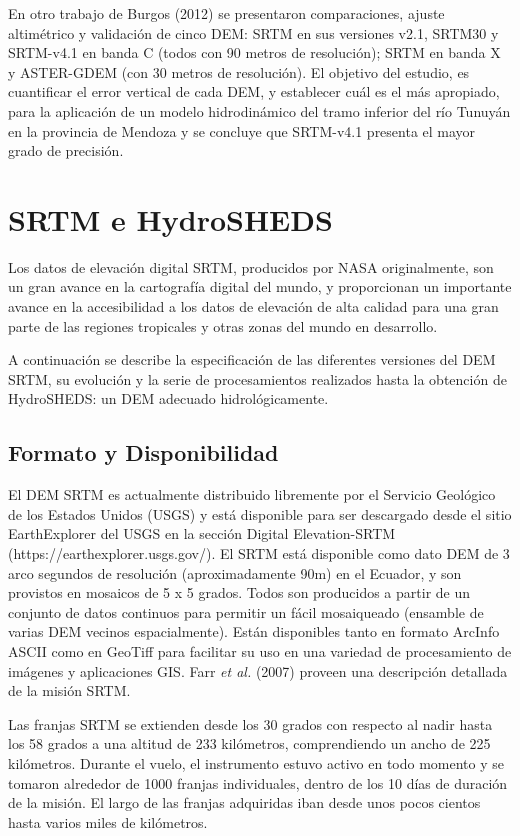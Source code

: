 \documentclass[10pt,a4paper, twoside]{report}
\begin{document}
En otro trabajo de Burgos (2012) se presentaron comparaciones, ajuste altimétrico y validación de cinco DEM: SRTM en sus versiones v2.1, SRTM30 y SRTM-v4.1 en banda C (todos con 90 metros de resolución); SRTM en banda X y ASTER-GDEM (con 30 metros de resolución). El objetivo del estudio, es cuantificar el error vertical de cada DEM, y
establecer cuál es el más apropiado, para la aplicación de un modelo hidrodinámico del tramo inferior del río Tunuyán en la provincia de Mendoza y se concluye que SRTM-v4.1 presenta el mayor grado de precisión. 

\section{SRTM e HydroSHEDS}
\label{SRTMeHydroSHEDS}

Los datos de elevación digital SRTM, producidos por NASA originalmente, son un gran avance en la cartografía digital del mundo, y proporcionan un importante avance en la accesibilidad a los datos de elevación de alta calidad para una gran parte de las regiones tropicales y otras zonas del mundo en desarrollo.

A continuación se describe la especificación de las diferentes versiones del DEM SRTM, su evolución y la serie de procesamientos realizados hasta la obtención de HydroSHEDS: un DEM adecuado hidrológicamente.



\subsection{Formato y Disponibilidad}

El DEM SRTM es actualmente distribuido libremente por el Servicio Geológico de los Estados Unidos (USGS) y está disponible para ser descargado desde el sitio EarthExplorer del USGS en la sección Digital Elevation-SRTM (https://earthexplorer.usgs.gov/). El SRTM está disponible como dato DEM de 3 arco segundos de resolución (aproximadamente 90m) en el Ecuador, y son provistos en mosaicos de 5 x 5 grados. Todos son producidos a partir de un conjunto de datos continuos para permitir un fácil mosaiqueado (ensamble de varias DEM vecinos espacialmente). Están disponibles tanto en formato ArcInfo ASCII como en GeoTiff para facilitar su uso en una variedad de procesamiento de imágenes y aplicaciones GIS. Farr \textit{et al.} (2007) proveen una descripción detallada de la misión SRTM.

Las franjas SRTM se extienden desde los 30 grados con respecto al nadir hasta los 58 grados a una altitud de 233 kilómetros, comprendiendo un ancho de 225 kilómetros. Durante el vuelo, el instrumento estuvo activo en todo momento y se tomaron alrededor de 1000 franjas individuales, dentro de los 10 días de duración de la misión. El largo de las franjas adquiridas iban desde unos pocos cientos hasta varios miles de kilómetros.
\end{document}
